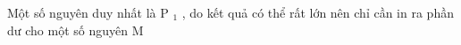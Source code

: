 Một số nguyên duy nhất là P   $_    1   $   , do kết quả có thể rất lớn nên chỉ cần in ra phần dư cho một số nguyên M  

\